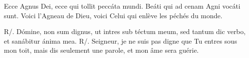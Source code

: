 
\begin{paracol}{2}

\LigneParacol
{Ecce Agnus Dei, ecce qui tollit peccáta mundi. Beáti qui ad cenam Agni vocáti sunt.}
{Voici l’Agneau de Dieu, voici Celui qui enlève les péchés du monde.}

\LigneParacol
{R/. Dómine, non sum dignus, ut intres sub téctum meum, sed tantum dic verbo, et sanábitur ánima mea.}
{R/. Seigneur, je ne suis pas digne que Tu entres sous mon toit, mais dis seulement une parole, et mon âme sera guérie.}

\end{paracol}
